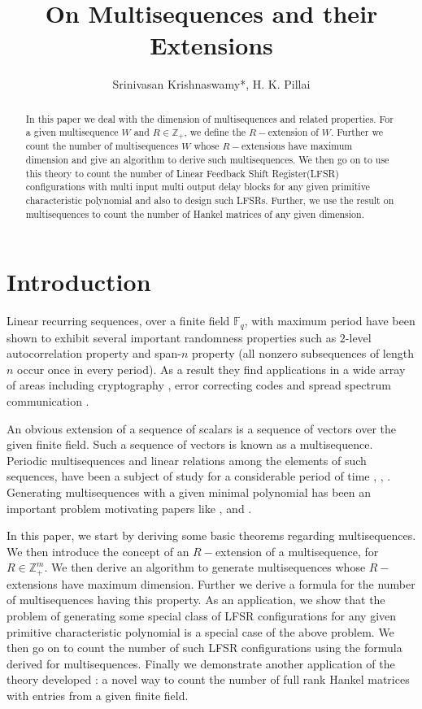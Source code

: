 \documentclass[letterpaper, 12 pt]{article}  \usepackage{amssymb}
\title{
On Multisequences and their Extensions  
}
\author{Srinivasan Krishnaswamy*, H. K. Pillai}
\newcommand{\F}{\mathbb{F}}
\begin{document}
\maketitle

\begin{abstract}
In this paper we deal with the dimension of multisequences and related
properties. For a given multisequence $W$ and $R \in \mathbb{Z}_+$, we define
the $R-$extension of $W$. Further we count the number of multisequences $W$
whose $R-$extensions have maximum dimension and give an algorithm to derive
such multisequences. We then go on to use this theory to count the number of
Linear Feedback Shift Register(LFSR) configurations with multi input multi
output delay blocks for any given primitive characteristic polynomial and
also to design such LFSRs. Further, we use the result on multisequences to count the number of Hankel matrices of
any given dimension. 
\end{abstract}

\section{Introduction}
Linear recurring sequences, over a finite field $\F_q$, with maximum period have been shown to 
exhibit several important randomness properties such as $2$-level
autocorrelation property and span-$n$ property (all nonzero subsequences of
length $n$ occur once in every period)\cite{Golomb}. As a result they  
find applications in a wide array of areas including  cryptography 
\cite{Schneier}, error correcting
codes  \cite{peterson} and spread spectrum communication \cite{pickholtz}. 

An obvious extension of a sequence of scalars is a sequence of vectors over the
given finite field. Such a sequence of vectors is known as a multisequence.
Periodic multisequences and linear relations among the elements of such
sequences,  have been a subject of study for a considerable period of time
\cite{Daykin}, \cite{Mullen}, \cite{Yucas}. Generating multisequences with a
given minimal polynomial has been an important problem motivating papers like
\cite{Ecuyer}, \cite{Neider1} and \cite{Neider2}.  

In this paper, we start by deriving some basic theorems regarding
multisequences. We then introduce the concept of an $R-$extension of a
multisequence, for $R \in \mathbb{Z}_+^m$. We then derive an
algorithm to generate multisequences whose $R-$extensions have maximum dimension. Further
we derive a formula for the number of multisequences having this property.
As an application, we show that the problem of generating some special class of LFSR configurations for any given primitive characteristic polynomial is a special case of the above problem. We then go on to count the number of such LFSR configurations using the
formula derived for multisequences. Finally we demonstrate another application of the theory developed : a novel way to count the number of full rank Hankel matrices with entries from a given finite field. 
\end{document}
